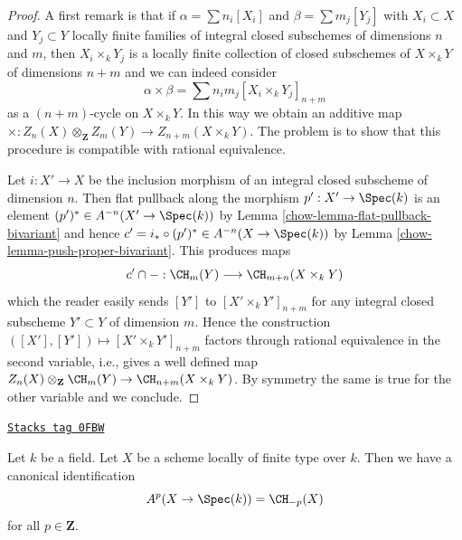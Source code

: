 \begin{proof}

A first remark is that if $\alpha = \sum n_i[X_i]$
and $\beta = \sum m_j[Y_j]$ with $X_i \subset X$ and $Y_j \subset Y$
locally finite families of integral closed subschemes of
dimensions $n$ and $m$, then
$X_i \times_k Y_j$ is a locally finite
collection of closed subschemes of $X \times_k Y$ of
dimensions $n + m$ and we can indeed consider
$$
\alpha \times \beta = \sum n_i m_j [X_i \times_k Y_j]_{n + m}
$$
as a $(n + m)$-cycle on $X \times_k Y$. In this way we obtain an
additive map
$\times : Z_n(X) \otimes_{\mathbf{Z}} Z_m(Y) \to Z_{n + m}(X \times_k Y)$.
The problem is to show that
this procedure is compatible with rational equivalence.

\medskip\noindent
Let $i : X' \to X$ be the inclusion morphism of
an integral closed subscheme of dimension $n$.
Then flat pullback along the morphism $p' : X' \to \Spec(k)$ is an element
$(p')^* \in A^{-n}(X' \to \Spec(k))$ by
Lemma \ref{chow-lemma-flat-pullback-bivariant}
and hence $c' = i_* \circ (p')^* \in A^{-n}(X \to \Spec(k))$ by
Lemma \ref{chow-lemma-push-proper-bivariant}.
This produces maps
$$
c' \cap - : \CH_m(Y) \longrightarrow \CH_{m + n}(X \times_k Y)
$$
which the reader easily sends $[Y']$ to $[X' \times_k Y']_{n + m}$
for any integral closed subscheme $Y' \subset Y$ of dimension
$m$. Hence the construction
$([X'], [Y']) \mapsto [X' \times_k Y']_{n + m}$
factors through rational equivalence in the second variable, i.e.,
gives a well defined map
$Z_n(X) \otimes_{\mathbf{Z}} \CH_m(Y) \to \CH_{n + m}(X \times_k Y)$.
By symmetry the same is true for the other variable and we conclude.
\end{proof}

\begin{lemma}
\label{chow-lemma-chow-cohomology-towards-point}
\href{https://stacks.math.columbia.edu/tag/0FBW}{\texttt{Stacks tag 0FBW}}

Let $k$ be a field. Let $X$ be a scheme locally of finite type over $k$.
Then we have a canonical identification
$$
A^p(X \to \Spec(k)) = \CH_{-p}(X)
$$
for all $p \in \mathbf{Z}$.
\end{lemma}

